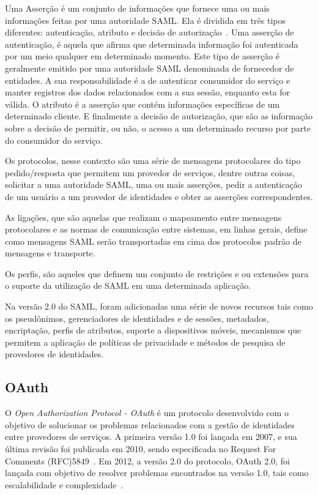 Uma Asserção é um conjunto de informações que fornece uma ou mais informações feitas por uma autoridade SAML. Ela é dividida em três tipos diferentes: autenticação, atributo e decisão de autorização~\cite{Madsen2005,Nordbotten09,Bertino2010}. Uma asserção de autenticação, é aquela que afirma que determinada informação foi autenticada por um meio qualquer em determinado momento. Este tipo de asserção é geralmente emitido por uma autoridade SAML denominada de fornecedor de entidades. A sua responsabilidade é a de autenticar consumidor do serviço e manter registros dos dados relacionados com a sua sessão, enquanto esta for válida. O atributo é a asserção que contém informações específicas de um determinado cliente. E finalmente a decisão de autorização, que são as informação sobre a decisão de permitir, ou não, o acesso a um determinado recurso por parte do consumidor do serviço.

Os protocolos, nesse contexto são uma série de mensagens protocolares do tipo pedido/resposta que permitem um provedor de serviços, dentre outras coisas, solicitar a uma autoridade SAML, uma ou mais asserções, pedir a autenticação de um usuário a um provedor de identidades e obter as asserções correspondentes.

As ligações, que são aquelas que realizam o mapeamento entre mensagens protocolares e as normas de comunicação entre sistemas, em linhas gerais, define como mensagens SAML serão transportadas em cima dos protocolos padrão de mensagens e transporte.

Os perfis, são aqueles que definem um conjunto de restrições e ou extensões para o suporte da utilização de SAML em uma determinada aplicação.

Na versão 2.0 do SAML, foram adicionadas uma série de novos recursos tais como os pseudônimos, gerenciadores de identidades e de sessões, metadados, encriptação, perfis de atributos, suporte a dispositivos móveis, mecanismos que permitem a aplicação de políticas de privacidade e métodos de pesquisa de provedores de identidades.

\subsection{OAuth}

O \emph{Open Authorization Protocol - OAuth} é um protocolo desenvolvido com o objetivo de solucionar os problemas relacionados com a gestão de identidades entre provedores de serviços. A primeira versão 1.0 foi lançada em 2007, e sua última revisão foi publicada em 2010, sendo especificada no Request For Comments (RFC)5849~\cite{oauth210}. Em 2012, a versão 2.0 do protocolo, OAuth 2.0, foi lançada com objetivo de resolver problemas encontrados na versão 1.0, tais como escalabilidade e complexidade~\cite{rfc6749}.

